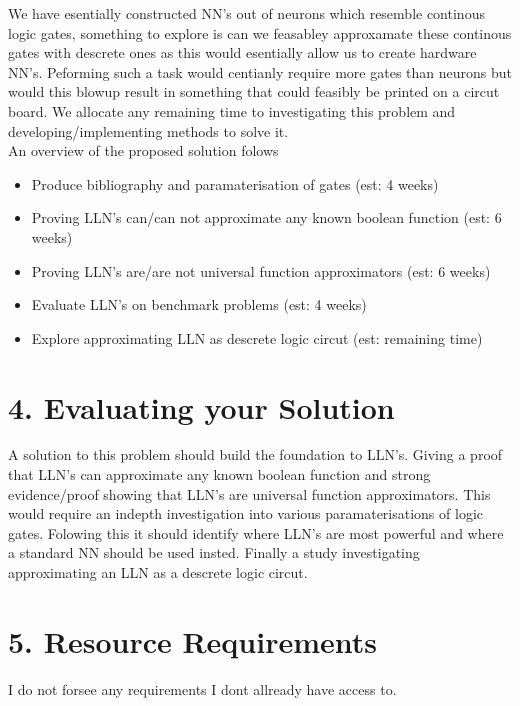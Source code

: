 \documentclass[11pt, a4paper, twoside, openright]{report}
\begin{document}
We have esentially constructed NN's out of neurons which resemble continous logic gates, something to explore is can we feasabley approxamate these continous gates with descrete ones as this would esentially allow us to create hardware NN's. Peforming such a task would centianly require more gates than neurons but would this blowup result in something that could feasibly be printed on a circut board. We allocate any remaining time to investigating this problem and developing/implementing methods to solve it.\\

An overview of the proposed solution folows
\begin{itemize}
\item Produce bibliography and paramaterisation of gates (est: 4 weeks)
\item Proving LLN's can/can not approximate any known boolean function (est: 6 weeks)
\item Proving LLN's are/are not universal function approximators (est: 6 weeks)
\item Evaluate LLN's on benchmark problems (est: 4 weeks)
\item Explore approximating LLN as descrete logic circut (est: remaining time)
\end{itemize}

\section*{4. Evaluating your Solution}

A solution to this problem should build the foundation to LLN's. Giving a proof that LLN's can approximate any known boolean function and strong evidence/proof showing that LLN's are universal function approximators. This would require an indepth investigation into various paramaterisations of logic gates. Folowing this it should identify where LLN's are most powerful and where a standard NN should be used insted. Finally a study investigating approximating an LLN as a descrete logic circut.

\section*{5. Resource Requirements}

I do not forsee any requirements I dont allready have access to.

\backmatter

%


\end{document}
